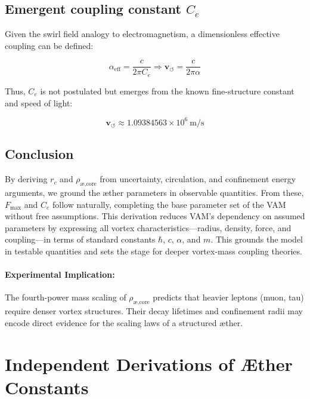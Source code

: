         \subsection{Emergent coupling constant \texorpdfstring{$C_e$}{Ce}}
        Given the swirl field analogy to electromagnetism, a dimensionless effective coupling can be defined:

        \begin{equation}
        \alpha_\text{eff} = \frac{c}{2\pi C_e} \Rightarrow \mathbf{v}_{\scriptscriptstyle\boldsymbol{\circlearrowleft}} = \frac{c}{2\pi \alpha}
        \end{equation}

        Thus, $C_e$ is not postulated but emerges from the known fine-structure constant and speed of light:

        \begin{equation}
        \mathbf{v}_{\scriptscriptstyle\boldsymbol{\circlearrowleft}} \approx 1.09384563 \times 10^6 \ \text{m/s}
        \end{equation}


        \subsection{Conclusion}

        By deriving $r_c$ and $\rho_{\text{\ae,core}}$ from uncertainty, circulation, and confinement energy arguments, we ground the \ae{}ther parameters in observable quantities. From these, $F_{\max}$ and $C_e$ follow naturally, completing the base parameter set of the VAM without free assumptions. This derivation reduces VAM's dependency on assumed parameters by expressing all vortex characteristics—radius, density, force, and coupling—in terms of standard constants \(\hbar\), \(c\), \(\alpha\), and \(m\). This grounds the model in testable quantities and sets the stage for deeper vortex-mass coupling theories.

        \paragraph{Experimental Implication:} The fourth-power mass scaling of $\rho_{\text{\ae,core}}$ predicts that heavier leptons (muon, tau) require denser vortex structures. Their decay lifetimes and confinement radii may encode direct evidence for the scaling laws of a structured \ae{}ther.




\section{Independent Derivations of Æther Constants}


